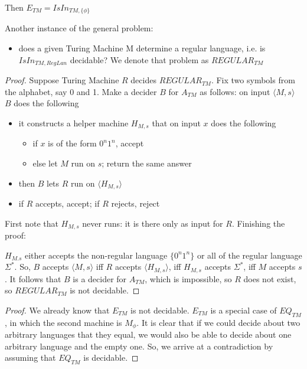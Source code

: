 Then $E_{TM} = IsIn_{TM,\{\phi\}}$


Another instance of the general problem:
\begin{itemize}
\item[] does a given Turing Machine M determine a regular language,
  i.e.  is $IsIn_{TM,RegLan}$ decidable? We denote that problem as 
$REGULAR_{TM}$
\end{itemize}

\begin{proof}
Suppose Turing Machine $R$ decides $REGULAR_{TM}$. Fix two symbols
from the alphabet, say 0 and 1. Make a decider $B$ for $A_{TM}$ as
follows: on input $\langle M,s \rangle$ $B$ does the following
\begin{itemize}
\item it constructs a helper machine $H_{M,s}$ that on input $x$ does
  the following
\begin{itemize}
\item if $x$ is of the form $0^n1^n$, accept
\item else let $M$ run on $s$; return the same answer
\end{itemize}

\item then $B$ lets $R$ run on  $\langle H_{M,s} \rangle$
\item if $R$ accepts, accept; if $R$ rejects, reject
\end{itemize}

First note that $H_{M,s}$ never runs: it is there only as input for
$R$. Finishing the proof:


$H_{M.s}$ either accepts the non-regular language $\{0^n1^n\}$
or all of the regular language $\Sigma^*$. So, $B$ accepts $\langle
M,s \rangle$ iff $R$ accepts $\langle H_{M,s} \rangle$, iff $H_{M,s}$
accepts $\Sigma^*$, iff $M$ accepts $s$. It follows that $B$ is a
decider for $A_{TM}$, which is impossible, so $R$ does not exist, so
$REGULAR_{TM}$ is not decidable.
\end{proof}


\begin{proof}
We already know that $E_{TM}$ is not decidable. $E_{TM}$ is a special
case of $EQ_{TM}$, in which the second machine is $M_\phi$. It is
clear that if we could decide about two arbitrary languages that they
equal, we would also be able to decide about one arbitrary language
and the empty one. So, we arrive at a contradiction by assuming that
$EQ_{TM}$ is decidable.
\end{proof}

